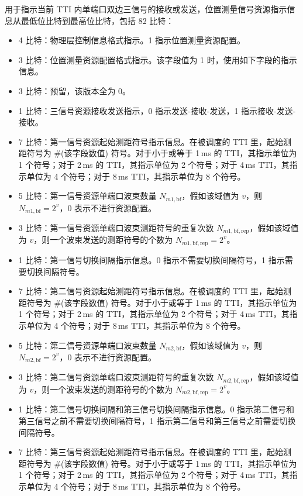 \documentclass[11pt,a4paper]{ctexart}
\begin{document}
用于指示当前 TTI 内单端口双边三信号的接收或发送，位置测量信号资源指示信息从最低位比特到最高位比特，包括 82 比特：
\begin{itemize}[nosep]
  \item 4 比特：物理层控制信息格式指示。1 指示位置测量资源配置。
  \item 3 比特：位置测量资源配置格式指示。该字段值为 1 时，使用如下字段的指示信息。
  \item 3 比特：预留，该版本全为 0。
  \item 1 比特：三信号资源接收发送指示，0 指示发送-接收-发送，1 指示接收-发送-接收。
  \item 7 比特：第一信号资源起始测距符号指示信息。在被调度的 TTI 里，起始测距符号为 \#(该字段数值) 符号。对于小于或等于 1\,ms 的 TTI，其指示单位为 1 个符号；对于 2\,ms 的 TTI，其指示单位为 2 个符号；对于 4\,ms TTI，其指示单位为 4 个符号；对于 8\,ms TTI，其指示单位为 8 个符号。
  \item 5 比特：第一信号资源单端口波束数量 $N_{m1,\mathrm{bf}}$，假如该域值为 $v$，则 $N_{m1,\mathrm{bf}} = 2^v$，0 表示不进行资源配置。
  \item 3 比特：第一信号资源单端口波束测距符号的重复次数 $N_{m1,\mathrm{bf,rep}}$，假如该域值为 $v$，则一个波束发送的测距符号的个数为 $N_{m1,\mathrm{bf,rep}} = 2^v$。
  \item 1 比特：第一信号切换间隔指示信息。0 指示不需要切换间隔符号，1 指示需要切换间隔符号。
  \item 7 比特：第二信号资源起始测距符号指示信息。在被调度的 TTI 里，起始测距符号为 \#(该字段数值) 符号。对于小于或等于 1\,ms 的 TTI，其指示单位为 1 个符号；对于 2\,ms 的 TTI，其指示单位为 2 个符号；对于 4\,ms TTI，其指示单位为 4 个符号；对于 8\,ms TTI，其指示单位为 8 个符号。
  \item 5 比特：第二信号资源单端口波束数量 $N_{m2,\mathrm{bf}}$，假如该域值为 $v$，则 $N_{m2,\mathrm{bf}} = 2^v$，0 表示不进行资源配置。
  \item 3 比特：第二信号资源单端口波束测距符号的重复次数 $N_{m2,\mathrm{bf,rep}}$，假如该域值为 $v$，则一个波束发送的测距符号的个数为 $N_{m2,\mathrm{bf,rep}} = 2^v$。
  \item 1 比特：第二信号切换间隔和第三信号切换间隔指示信息。0 指示第二信号和第三信号之前不需要切换间隔符号，1 指示第二信号和第三信号之前需要切换间隔符号。
  \item 7 比特：第三信号资源起始测距符号指示信息。在被调度的 TTI 里，起始测距符号为 \#(该字段数值) 符号。对于小于或等于 1\,ms 的 TTI，其指示单位为 1 个符号；对于 2\,ms 的 TTI，其指示单位为 2 个符号；对于 4\,ms TTI，其指示单位为 4 个符号；对于 8\,ms TTI，其指示单位为 8 个符号。

\end{itemize}
\end{document}

